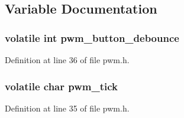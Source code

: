 \subsection{Variable Documentation}
\subsubsection[{\texorpdfstring{pwm\+\_\+button\+\_\+debounce}{pwm_button_debounce}}]{\setlength{\rightskip}{0pt plus 5cm}volatile int pwm\+\_\+button\+\_\+debounce}\hypertarget{group___p_w_m_ga9e95213338963b42b5a83712d32d3828}{}\label{group___p_w_m_ga9e95213338963b42b5a83712d32d3828}


Definition at line 36 of file pwm.\+h.

\subsubsection[{\texorpdfstring{pwm\+\_\+tick}{pwm_tick}}]{\setlength{\rightskip}{0pt plus 5cm}volatile char pwm\+\_\+tick}\hypertarget{group___p_w_m_ga354856dbd0205dcf3768b19da8f692d9}{}\label{group___p_w_m_ga354856dbd0205dcf3768b19da8f692d9}


Definition at line 35 of file pwm.\+h.

